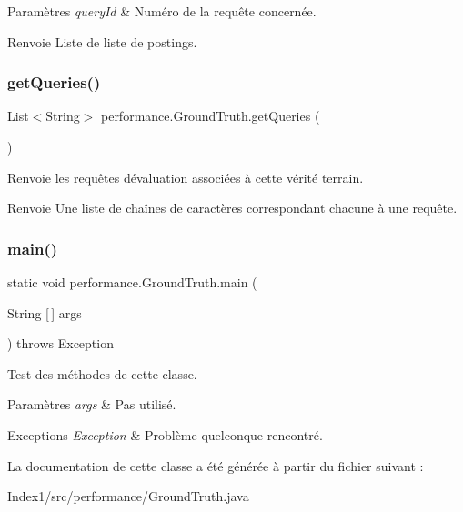 \begin{DoxyParams}{Paramètres}
{\em query\+Id} & Numéro de la requête concernée. \\
\hline
\end{DoxyParams}
\begin{DoxyReturn}{Renvoie}
Liste de liste de postings. 
\end{DoxyReturn}
\mbox{\label{classperformance_1_1GroundTruth_ac20e5c5f3051088a957b5dd516bbf9c5}} 
\subsubsection{\texorpdfstring{get\+Queries()}{getQueries()}}
{\footnotesize\ttfamily List$<$String$>$ performance.\+Ground\+Truth.\+get\+Queries (\begin{DoxyParamCaption}{ }\end{DoxyParamCaption})}

Renvoie les requêtes d\textquotesingle{}évaluation associées à cette vérité terrain.

\begin{DoxyReturn}{Renvoie}
Une liste de chaînes de caractères correspondant chacune à une requête. 
\end{DoxyReturn}
\mbox{\label{classperformance_1_1GroundTruth_a5708e978b3a80a3c512ca00bfaca37da}} 
\subsubsection{\texorpdfstring{main()}{main()}}
{\footnotesize\ttfamily static void performance.\+Ground\+Truth.\+main (\begin{DoxyParamCaption}\item[{String \mbox{[}$\,$\mbox{]}}]{args }\end{DoxyParamCaption}) throws Exception\hspace{0.3cm}{\ttfamily [static]}}

Test des méthodes de cette classe.


\begin{DoxyParams}{Paramètres}
{\em args} & Pas utilisé.\\
\hline
\end{DoxyParams}

\begin{DoxyExceptions}{Exceptions}
{\em Exception} & Problème quelconque rencontré. \\
\hline
\end{DoxyExceptions}


La documentation de cette classe a été générée à partir du fichier suivant \+:\begin{DoxyCompactItemize}
\item 
Index1/src/performance/Ground\+Truth.\+java\end{DoxyCompactItemize}
